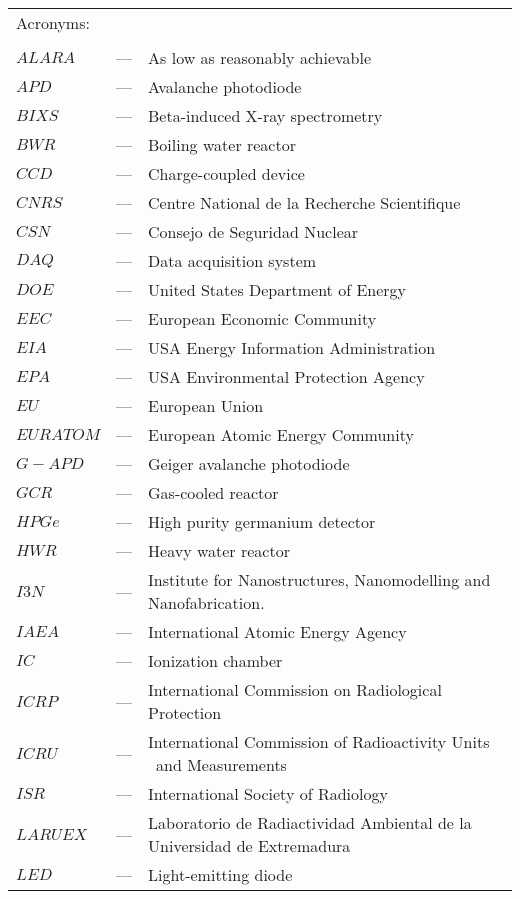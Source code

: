 \begin{longtable}{p{25mm} c p{120mm} }
\multicolumn{3}{l}{Acronyms:}\\
\\
$ALARA$ & --- & As low as reasonably achievable\\
$APD$ & --- & Avalanche photodiode\\
$BIXS$ & --- & Beta-induced X-ray spectrometry\\
$BWR$ & --- & Boiling water reactor\\
$CCD$ & --- & Charge-coupled device\\
$CNRS$ & --- & Centre National de la Recherche Scientifique\\
$CSN$ & --- & Consejo de Seguridad Nuclear\\
$DAQ$ & --- & Data acquisition system\\
$DOE$ & --- & United States Department of Energy\\
$EEC$ & --- & European Economic Community\\
$EIA$ & --- & USA Energy Information Administration\\
$EPA$ & --- & USA Environmental Protection Agency\\
$EU$ & --- & European Union\\
$EURATOM$ & --- & European Atomic Energy Community\\
$G-APD$ & --- & Geiger avalanche photodiode\\
$GCR$ & --- & Gas-cooled reactor\\
$HPGe$ & --- & High purity germanium detector\\
$HWR$ & --- & Heavy water reactor\\
$I3N$ & --- & Institute for Nanostructures, Nanomodelling and
\newline
Nanofabrication.\\
$IAEA$ & --- & International Atomic Energy Agency \\
$IC$ & --- & Ionization chamber\\
$ICRP$ & --- & International Commission on Radiological Protection \\
$ICRU$ & --- & International Commission of Radioactivity Units 
\
and Measurements\\
$ISR$ & --- & International Society of Radiology \\
$LARUEX$ & --- & Laboratorio de Radiactividad Ambiental de la
\newline
Universidad de Extremadura\\
$LED$ & --- & Light-emitting diode \\

\end{longtable}
